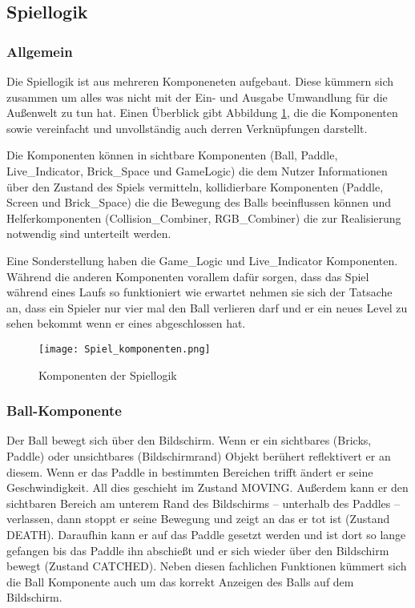 \documentclass{scrartcl}
\begin{document}
\subsection{Spiellogik}
\subsubsection{Allgemein}
Die Spiellogik ist aus mehreren Komponeneten aufgebaut. Diese kümmern sich
zusammen um alles was nicht mit der Ein- und Ausgabe Umwandlung für die
Außenwelt zu tun hat. Einen Überblick gibt Abbildung \ref{spiel_komponenten},
die die Komponenten sowie vereinfacht und unvollständig auch derren
Verknüpfungen darstellt.

Die Komponenten können in sichtbare Komponenten (Ball, Paddle,
Live\_Indicator, Brick\_Space und Game\textunderscore Logic) die dem Nutzer
Informationen über den Zustand des Spiels vermitteln, kollidierbare Komponenten (Paddle,
Screen und Brick\_Space) die die Bewegung des Balls beeinflussen können und
Helferkomponenten (Collision\_Combiner, RGB\_Combiner) die zur Realisierung
notwendig sind unterteilt werden.

Eine Sonderstellung haben die Game\_Logic und Live\_Indicator Komponenten.
Während die anderen Komponenten vorallem dafür sorgen, dass das Spiel während
eines Laufs so funktioniert wie erwartet nehmen sie sich der Tatsache an, dass
ein Spieler nur vier mal den Ball verlieren darf und er ein neues Level zu sehen
bekommt wenn er eines abgeschlossen hat.

\begin{figure}[ht]
	\centering
	\texttt{[image: Spiel\_komponenten.png]}
	\caption{Komponenten der Spiellogik}
	\label{spiel_komponenten}
\end{figure}


\subsubsection{Ball-Komponente}
Der Ball bewegt sich über den Bildschirm.
Wenn er ein sichtbares (Bricks, Paddle) oder unsichtbares (Bildschirmrand) Objekt berühert reflektivert er an diesem.
Wenn er das Paddle in bestimmten Bereichen trifft ändert er seine Geschwindigkeit.
All dies geschieht im Zustand MOVING.
Außerdem kann er den sichtbaren Bereich am unterem Rand des Bildschirms – unterhalb des Paddles – verlassen, dann stoppt er seine Bewegung und zeigt an das er tot ist (Zustand DEATH).
Daraufhin kann er auf das Paddle gesetzt werden und ist dort so lange gefangen bis das Paddle ihn abschießt und er sich wieder über den Bildschirm bewegt (Zustand CATCHED).
Neben diesen fachlichen Funktionen kümmert sich die Ball Komponente auch um das korrekt Anzeigen des Balls auf dem Bildschirm.
\end{document}
